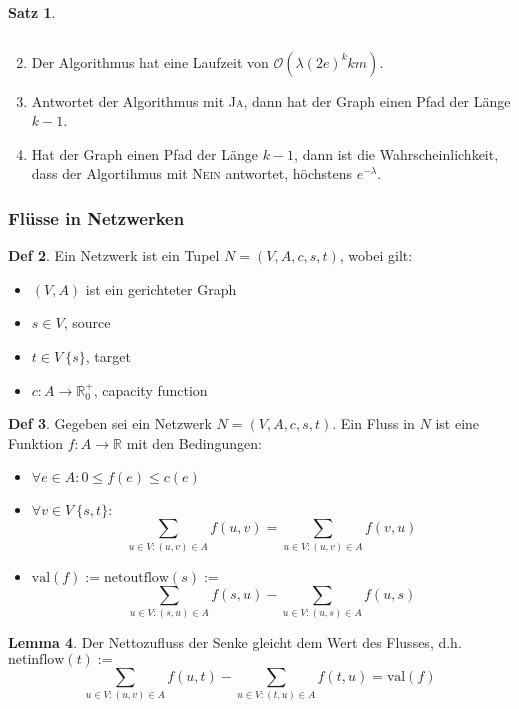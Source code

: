 \documentclass[a4paper, 10pt]{article}
\theoremstyle{definition}
\newtheorem{definition}{Def}[section]
\newtheorem{theorem}[definition]{Satz}
\newtheorem{nlemma}[definition]{Lemma}
\theoremstyle{named}
\newcommand{\R}{\mathbb{R}}
\newcommand{\BO}{\mathcal{O}}
\newcommand{\val}{\text{val}}
\newcommand{\net}{N = (V, A, c, s, t)}
\begin{document}
\begin{theorem}
    \begin{enumerate} $\,$
        \item Der Algorithmus hat eine Laufzeit von $\BO(\lambda(2e)^kkm)$.
        \item Antwortet der Algorithmus mit \textsc{Ja}, dann hat der Graph einen Pfad der Länge $k - 1$.
        \item Hat der Graph einen Pfad der Länge $k-1$, dann ist die Wahrscheinlichkeit, dass der Algortihmus mit \textsc{Nein} antwortet, höchstens $e^{-\lambda}$.
    \end{enumerate}
\end{theorem}

\subsubsection{Flüsse in Netzwerken}
\begin{definition}
    Ein Netzwerk ist ein Tupel $\net$, wobei gilt:
    \begin{itemize}
        \item $(V, A)$ ist ein gerichteter Graph
        \item $s \in V$, source
        \item $t \in V\ \{s\}$, target
        \item $c: A \to \R_0^+$, capacity function
    \end{itemize}
\end{definition}

\begin{definition}
    Gegeben sei ein Netzwerk $\net$. Ein Fluss in $N$ ist eine Funktion $f: A \to \R$ mit den Bedingungen:
    \begin{itemize}
        \item $\forall e \in A: 0 \leq f(e) \leq c(e)$
        \item $\forall v \in V \ \{s,t\}:$ $$\sum_{u \in V: (u, v) \in A} f(u, v) = \sum_{u \in V: (u, v) \in A} f(v, u)$$
        \item $\val(f) := \text{netoutflow}(s) :=$ $$\sum_{u \in V: (s, u) \in A} f(s, u) - \sum_{u \in V: (u, s) \in A} f(u, s)$$
    \end{itemize}
\end{definition}

\begin{nlemma}
    Der Nettozufluss der Senke gleicht dem Wert des Flusses, d.h. $\text{netinflow}(t) :=$
    $$\sum_{u \in V: (u, v) \in A}f(u,t) - \sum_{u \in V: (t, u) \in A} f(t, u) = \val(f)$$
\end{nlemma}
\end{document}
